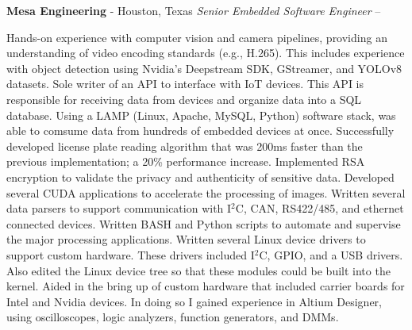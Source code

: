 \documentclass[letterpaper,MMMyyyy,nonstopmode]{simpleresumecv}
\begin{document}
\begin{Body}
    {\textbf{Mesa Engineering}}
    - Houston, Texas
        {\textit{Senior Embedded Software Engineer}}
    \hfill
     --

    \begin{Detail}
        \BulletItem
        Hands-on experience with computer vision and camera pipelines, providing an understanding of video encoding standards (e.g., H.265). This includes experience with object detection using Nvidia's Deepstream SDK, GStreamer, and YOLOv8 datasets.
        \vspace{1mm} %
        \BulletItem
        Sole writer of an API to interface with IoT devices. This API is responsible for receiving data from devices and organize data into a SQL database. Using a LAMP (Linux, Apache, MySQL, Python) software stack, was able to comsume data from hundreds of embedded devices at once.
        \vspace{1mm} %
        \BulletItem
        Successfully developed license plate reading algorithm that was 200ms faster than the previous implementation; a 20\% performance increase.
        \vspace{1mm} %
        \BulletItem
        Implemented RSA encryption to validate the privacy and authenticity of sensitive data.
        \vspace{1mm} %
        \BulletItem
        Developed several CUDA applications to accelerate the processing of images.
        \vspace{1mm} %
        \BulletItem
        Written several data parsers to support communication with I$^2$C, CAN, RS422/485, and ethernet connected devices.
        \vspace{1mm} %
        \BulletItem
        Written BASH and Python scripts to automate and supervise the major processing applications.
        \vspace{1mm} %
        \BulletItem
        Written several Linux device drivers to support custom hardware. These drivers included I$^2$C, GPIO, and a USB drivers. Also edited the Linux device tree so that these modules could be built into the kernel.
        \vspace{1mm} %
        \BulletItem
        Aided in the bring up of custom hardware that included carrier boards for Intel and Nvidia devices. In doing so I gained experience in Altium Designer, using oscilloscopes, logic analyzers, function generators, and DMMs.

\end{Detail}
\end{Body}
\end{document}
